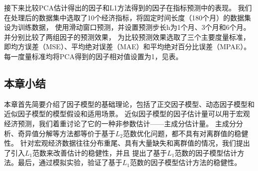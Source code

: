 接下来比较PCA估计得出的因子和L1方法得到的因子在指标预测中的表现。
我们在处理后的数据集中选取了10个经济指标，将固定时间长度（180个月）的数据集设为训练数据，
使用滑动窗口预测，并设置预测步长h为1个月、3个月和6个月。并分别比较了两组因子的预测效果，
为比较预测效果选取了三个主要度量标准，即均方误差（MSE）、平均绝对误差（MAE）和平均绝对百分比误差（MPAE）。
每一度量标准均将PCA得到的因子相对值设置为1，见表。


\subsection{本章小结}
本章首先简要介绍了因子模型的基础理论，包括了正交因子模型、动态因子模型和近似因子模型的模型假设和适用场景。
近似因子模型的因子估计量可以用于宏观经济预测，我们着重讨论了它的一种非参数估计——主成分估计量。
主成分分析、奇异值分解等方法都等价于基于$L_2$范数优化问题，都不具有对离群值的稳健性。
针对宏观经济数据往往分布重尾、具有大量缺失和离群值的情况，我们提出了引入$L_1$范数来改善估计的稳健性，并且
提出了基于$L_1$范数的因子模型估计方法。最后，通过模拟实验，验证了基于$L_1$范数的因子模型估计方法的稳健性。